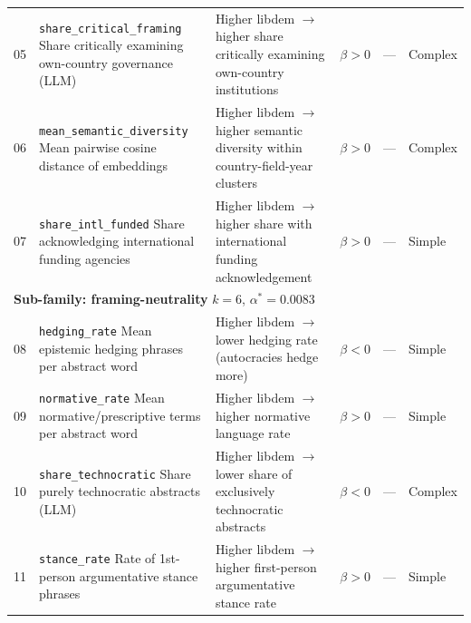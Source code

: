\documentclass[12pt,a4paper]{article}
\begin{document}
\begin{landscape}
\begin{longtable}{
  @{}
  p{0.6cm}   %
  p{3.6cm}   %
  p{6.0cm}   %
  p{1.4cm}   %
  p{4.0cm}   %
  p{1.2cm}   %
  @{}
}
05 & \texttt{share\_critical\_framing} \newline \footnotesize{Share critically examining own-country governance (LLM)}
   & Higher libdem $\to$ higher share critically examining own-country institutions
   & $\beta > 0$ & --- & Complex \\[4pt]

06 & \texttt{mean\_semantic\_diversity} \newline \footnotesize{Mean pairwise cosine distance of embeddings}
   & Higher libdem $\to$ higher semantic diversity within country-field-year clusters
   & $\beta > 0$ & --- & Complex \\[4pt]

07 & \texttt{share\_intl\_funded} \newline \footnotesize{Share acknowledging international funding agencies}
   & Higher libdem $\to$ higher share with international funding acknowledgement
   & $\beta > 0$ & --- & Simple \\[10pt]

\multicolumn{6}{l}{\textbf{Sub-family: framing-neutrality} \quad $k=6$, $\alpha^* = 0.0083$} \\[2pt]

08 & \texttt{hedging\_rate} \newline \footnotesize{Mean epistemic hedging phrases per abstract word}
   & Higher libdem $\to$ lower hedging rate (autocracies hedge more)
   & $\beta < 0$ & --- & Simple \\[4pt]

09 & \texttt{normative\_rate} \newline \footnotesize{Mean normative/prescriptive terms per abstract word}
   & Higher libdem $\to$ higher normative language rate
   & $\beta > 0$ & --- & Simple \\[4pt]

10 & \texttt{share\_technocratic} \newline \footnotesize{Share purely technocratic abstracts (LLM)}
   & Higher libdem $\to$ lower share of exclusively technocratic abstracts
   & $\beta < 0$ & --- & Complex \\[4pt]

11 & \texttt{stance\_rate} \newline \footnotesize{Rate of 1st-person argumentative stance phrases}
   & Higher libdem $\to$ higher first-person argumentative stance rate
   & $\beta > 0$ & --- & Simple \\[4pt]


\end{longtable}
\end{landscape}
\end{document}
